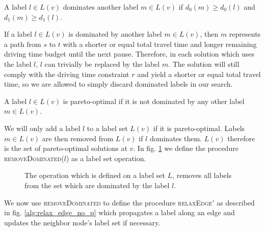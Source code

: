 \begin{definition}
	A label $l \in L(v)$ dominates another label $m \in L(v)$ if $d_0(m) \ge d_0(l)$ and $d_1(m) \ge d_1(l)$.
\end{definition}

If a label $l \in L(v)$ is dominated by another label $m \in L(v)$, then $m$ represents a path from $s$ to $t$ with a shorter or equal total travel time and longer remaining driving time budget until the next pause. Therefore, in each solution which uses the label $l$, $l$ can trivially be replaced by the label $m$. The solution will still comply with the driving time constraint $r$ and yield a shorter or equal total travel time, so we are allowed to simply discard dominated labels in our search.

\begin{definition}
	A label $l \in L(v)$ is pareto-optimal if it is not dominated by any other label $m \in L(v)$.
\end{definition}

We will only add a label $l$ to a label set $L(v)$ if it is pareto-optimal. Labels $m \in L(v)$ are then removed from $L(v)$ if $l$ dominates them. $L(v)$ therefore is the set of pareto-optimal solutions at $v$. In fig. \ref{alg:remove_dominated} we define the procedure \textsc{removeDominated($l$)} as a label set operation.

\begin{figure}[hbtp]
	\setlength{\interspacetitleruled}{0pt}%
	\setlength{\algotitleheightrule}{0pt}%
	\begin{algorithm*}[H]
		\DontPrintSemicolon


	\end{algorithm*}
	\setlength{\interspacetitleruled}{2pt}%
	\setlength{\algotitleheightrule}{\algotitleheightruledefault}%

	\caption{\label{alg:remove_dominated}The operation which is defined on a label set $L$, removes all labels from the set which are dominated by the label $l$.}
\end{figure}

We now use \textsc{removeDominated} to define the procedure \textsc{relaxEdge$'$} as described in fig. \ref{alg:relax_edge_no_p} which propagates a label along an edge and updates the neighbor node's label set if necessary.

